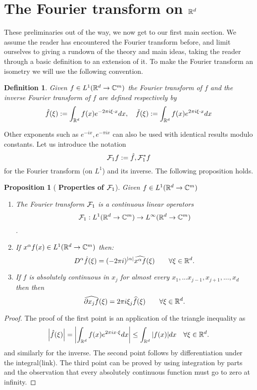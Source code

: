 \documentclass[12pt]{article}
\newtheorem{proposition}{Proposition}
\newtheorem{definition}{Definition}
\begin{document}
\section{The Fourier transform on ${\mathbb R}^d$}
These preliminaries out of the way, we now get to our first main section. We assume the reader has encountered the Fourier transform before, and limit ourselves to giving a rundown of the theory and main ideas, taking the reader through a basic definition to an extension of it. To make the Fourier transform an isometry we will use the following convention.
\begin{definition}
	Given $f\in L^1({\mathbb R}^d\to\mathbb{C}^m)$ the \emph{Fourier transform} of $f$ and the \emph{inverse Fourier transform of} $f$ are defined respectively by
	\[\hat{f}(\xi):=\int_{{\mathbb R}^d}f(x)e^{-2\pi i\xi\cdot  x} dx, \quad \check{f}(\xi):=\int_{{\mathbb R}^d}f(x)e^{2\pi i\xi\cdot  x} dx \]
\end{definition}
Other exponents such as $e^{-ix}, e^{-\pi i x}$ can also be used with identical results modulo constants. Let us introduce the notation $$\mathcal{F}_1 f:=\hat{f}, \mathcal{F}_1^*f$$ for the Fourier transform (on $L^1$) and its inverse.  The following proposition holds.
\begin{proposition}[\textbf{ Properties of $\mathcal{F}_1$}]\label{regularitydecayft}
	Given $f\in L^1({\mathbb R}^d\to\mathbb{C}^m)$
	\begin{enumerate}
		\item The Fourier transform   $\mathcal{F}_1$ is a continuous linear operators $$\mathcal{F}_1:L^1({\mathbb R}^d\to\mathbb{C}^m) \to L^\infty({\mathbb R}^d\to\mathbb{C}^m)$$.
		\item If $x^\alpha f(x)\in L^1({\mathbb R}^d\to\mathbb{C}^m)$ then:\quad \[D^\alpha \hat{f}(\xi)=(-2\pi i)^\abs{\alpha}\widehat{x^{\alpha} f}(\xi)\qquad\forall \xi\in{\mathbb R}^d.\]
		\item If $f$ is absolutely continuous in $x_j$ for almost every $x_1,...x_{j-1},x_{j+1},...,x_d$ then
		      then
		      \[\widehat{\partial x_j f}(\xi)=2\pi i\xi_j\widehat{ f}(\xi)\qquad\forall \xi\in{\mathbb R}^d.\]
	\end{enumerate}
\end{proposition}
\begin{proof}
	The proof of the first point is an application of the triangle inequality as
	\begin{equation*}
		\abs{\hat{f}(\xi )}=\abs{\int_{{\mathbb R}^d}f(x)e^{2\pi i x\cdot \xi } dx}\leq\int_{{\mathbb R}^d}\abs{f(x)}dx\quad\forall \xi \in {\mathbb R}^d.
	\end{equation*}
	and similarly for the inverse. The second point follows by differentiation under the integral(link). The third point can be proved by using integration by parts and the observation that every absolutely continuous function must go to zero at infinity.
\end{proof}
\end{document}
